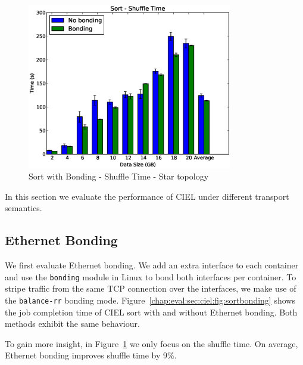 \documentclass[a4paper,12pt,twoside,openright]{report}
\begin{document}
\begin{figure}[h!]
  \centering
    \includegraphics[width=0.8\textwidth]{shuffle_bonding_no_bonding.eps}
    \caption{Sort with Bonding - Shuffle Time - Star topology}
    \label{chap:eval:sec:ciel:fig:sortshuffle}
\end{figure}

In this section we evaluate the performance of CIEL under different transport
semantics.

\subsection{Ethernet Bonding}
We first evaluate Ethernet bonding. We add an extra interface to each container
and use the \texttt{bonding} module in Linux to bond both interfaces per
container. To stripe traffic from the same TCP connection over the interfaces,
we make use of the \texttt{balance-rr} bonding mode.
Figure~\ref{chap:eval:sec:ciel:fig:sortbonding} shows the job completion time of
CIEL sort with and without Ethernet bonding. Both methods exhibit the same
behaviour.

To gain more insight, in Figure~\ref{chap:eval:sec:ciel:fig:sortshuffle} we only
focus on the shuffle time. On average, Ethernet bonding improves shuffle time
by 9\%.
\end{document}
